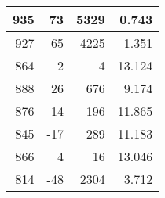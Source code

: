 \begin{longtable}{|r|r|r|r|}
	935                                                                                             & 73                                                & 5329                                                 & 0.743                                                                                          \\ \hline
	927                                                                                             & 65                                                & 4225                                                 & 1.351                                                                                          \\ \hline
	864                                                                                             & 2                                                 & 4                                                    & 13.124                                                                                         \\ \hline
	888                                                                                             & 26                                                & 676                                                  & 9.174                                                                                          \\ \hline
	876                                                                                             & 14                                                & 196                                                  & 11.865                                                                                         \\ \hline
	845                                                                                             & -17                                               & 289                                                  & 11.183                                                                                         \\ \hline
	866                                                                                             & 4                                                 & 16                                                   & 13.046                                                                                         \\ \hline
	814                                                                                             & -48                                               & 2304                                                 & 3.712                                                                                          \\ \hline

\end{longtable}
